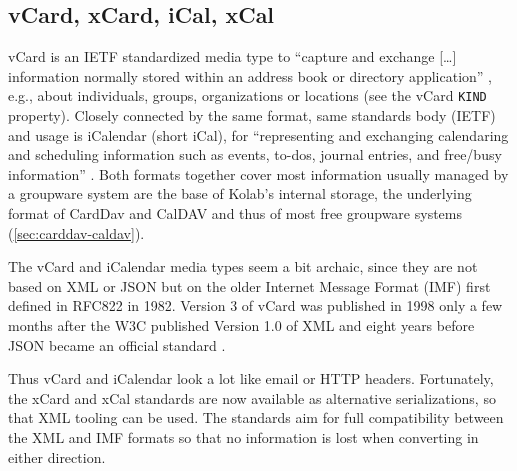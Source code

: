 \documentclass[11pt,a4paper,headsepline,twoside]{scrartcl}		%
\begin{document}
\subsection{vCard, xCard, iCal, xCal}
\label{sec:vcard-xcard-ical}

vCard is an IETF standardized media type to ``capture and exchange [\ldots]
information normally stored within an address book or directory application''
\cite{RFC6350}, e.g., about individuals, groups, organizations or locations (see
the vCard \lstinline:KIND: property). Closely connected by the same format, same
standards body (IETF) and usage is iCalendar (short iCal), for ``representing
and exchanging calendaring and scheduling information such as events, to-dos,
journal entries, and free/busy information'' \cite{RFC5545}. Both formats
together cover most information usually managed by a groupware system are the
base of Kolab's internal storage, the underlying format of CardDav and CalDAV
and thus of most free groupware systems (\autoref{sec:carddav-caldav}).

The vCard and iCalendar media types seem a bit archaic, since they are not based
on XML or JSON but on the older Internet Message Format \cite{RFC5322} (IMF)
first defined in RFC822 in 1982. Version 3 of vCard was published in 1998
\cite{RFC2425} only a few months after the W3C published Version 1.0 of XML
\cite{Paoli:98:XR} and eight years before JSON became an official standard
\cite{RFC4627}.

Thus vCard and iCalendar look a lot like email or HTTP headers. Fortunately, the
xCard \cite{RFC6351} and xCal \cite{RFC6321} standards are now available as
alternative serializations, so that XML tooling can be used. The standards aim
for full compatibility between the XML and IMF formats so that no information is
lost when converting in either direction.


\end{document}
